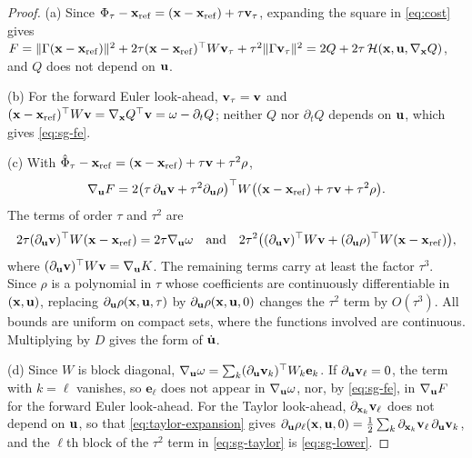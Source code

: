 \begin{proof}
(a) Since $\Phi_\tau - \mathbf{x}_{\mathrm{ref}} = (\mathbf{x} - \mathbf{x}_{\mathrm{ref}}) + \tau\mathbf{v}_\tau$, expanding the square in
\eqref{eq:cost} gives
$F = \lVert\Gamma(\mathbf{x} - \mathbf{x}_{\mathrm{ref}})\rVert^2 + 2\tau(\mathbf{x} - \mathbf{x}_{\mathrm{ref}})^\top W\mathbf{v}_\tau + \tau^2\lVert\Gamma\mathbf{v}_\tau\rVert^2
= 2Q + 2\tau\,\mathcal{H}(\mathbf{x},\mathbf{u},\nabla_{\mathbf{x}}Q)$, and $Q$ does not depend on $\mathbf{u}$.

(b) For the forward Euler look-ahead, $\mathbf{v}_\tau = \mathbf{v}$ and
$(\mathbf{x} - \mathbf{x}_{\mathrm{ref}})^\top W\mathbf{v} = \nabla_{\mathbf{x}}Q^\top\mathbf{v} = \omega - \partial_t Q$; neither $Q$ nor $\partial_t Q$
depends on $\mathbf{u}$, which gives \eqref{eq:sg-fe}.

(c) With $\hat\Phi_\tau - \mathbf{x}_{\mathrm{ref}} = (\mathbf{x} - \mathbf{x}_{\mathrm{ref}}) + \tau\mathbf{v} + \tau^2\rho$,
\[
    \nabla_{\mathbf{u}}F
    = 2\bigl(\tau\,\partial_{\mathbf{u}}\mathbf{v} + \tau^2\partial_{\mathbf{u}}\rho\bigr)^\top W
      \bigl((\mathbf{x} - \mathbf{x}_{\mathrm{ref}}) + \tau\mathbf{v} + \tau^2\rho\bigr).
\]
The terms of order $\tau$ and $\tau^2$ are
\[
    2\tau(\partial_{\mathbf{u}}\mathbf{v})^\top W(\mathbf{x} - \mathbf{x}_{\mathrm{ref}}) = 2\tau\nabla_{\mathbf{u}}\omega
    \quad\text{and}\quad
    2\tau^2\bigl((\partial_{\mathbf{u}}\mathbf{v})^\top W\mathbf{v} + (\partial_{\mathbf{u}}\rho)^\top W(\mathbf{x} - \mathbf{x}_{\mathrm{ref}})\bigr),
\]
where $(\partial_{\mathbf{u}}\mathbf{v})^\top W\mathbf{v} = \nabla_{\mathbf{u}}K$.
The remaining terms carry at least the factor $\tau^3$.
Since $\rho$ is a polynomial in $\tau$ whose coefficients are continuously differentiable in
$(\mathbf{x},\mathbf{u})$, replacing $\partial_{\mathbf{u}}\rho(\mathbf{x},\mathbf{u},\tau)$ by $\partial_{\mathbf{u}}\rho(\mathbf{x},\mathbf{u},0)$ changes the
$\tau^2$ term by $O(\tau^3)$.
All bounds are uniform on compact sets, where the functions involved are continuous.
Multiplying by $D$ gives the form of $\dot{\mathbf{u}}$.

(d) Since $W$ is block diagonal, $\nabla_{\mathbf{u}}\omega = \sum_k (\partial_{\mathbf{u}}\mathbf{v}_k)^\top
W_k\mathbf{e}_k$.
If $\partial_{\mathbf{u}}\mathbf{v}_\ell = 0$, the term with $k = \ell$ vanishes, so $\mathbf{e}_\ell$ does not appear
in $\nabla_{\mathbf{u}}\omega$, nor, by \eqref{eq:sg-fe}, in $\nabla_{\mathbf{u}}F$ for the forward Euler
look-ahead.
For the Taylor look-ahead, $\partial_{\mathbf{x}_k}\mathbf{v}_\ell$ does not depend on $\mathbf{u}$, so that
\eqref{eq:taylor-expansion} gives $\partial_{\mathbf{u}}\rho_\ell(\mathbf{x},\mathbf{u},0) =
\frac12\sum_k\partial_{\mathbf{x}_k}\mathbf{v}_\ell\,\partial_{\mathbf{u}}\mathbf{v}_k$, and the $\ell$th block of the
$\tau^2$ term in \eqref{eq:sg-taylor} is \eqref{eq:sg-lower}.
\end{proof}

